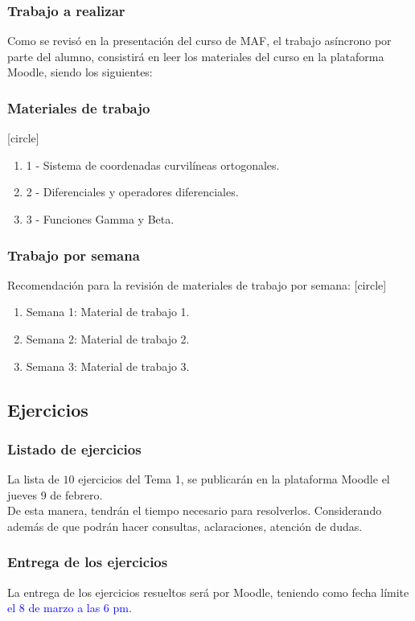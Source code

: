 \documentclass[12pt]{beamer}
\begin{document}
\begin{frame}
\frametitle{Trabajo a realizar}
Como se revisó en la presentación del curso de MAF, el trabajo asíncrono por parte del alumno, consistirá en leer los materiales del curso en la plataforma Moodle, siendo los siguientes:
\end{frame}
\begin{frame}
\frametitle{Materiales de trabajo}
[circle]
\begin{enumerate}[<+->]
\item 1 - Sistema de coordenadas curvilíneas ortogonales.
\item 2 - Diferenciales y operadores diferenciales.
\item 3 - Funciones Gamma y Beta.
\end{enumerate}
\end{frame}
\begin{frame}
\frametitle{Trabajo por semana}
Recomendación para la revisión de materiales de trabajo por semana:
[circle]
\begin{enumerate}[<+->]
\item Semana 1: Material de trabajo 1.
\item Semana 2: Material de trabajo 2.
\item Semana 3: Material de trabajo 3.
\end{enumerate}
\end{frame}

\subsection{Ejercicios}

\begin{frame}
\frametitle{Listado de ejercicios}
La lista de $10$ ejercicios del Tema 1, se publicarán en la plataforma Moodle el jueves 9 de febrero.
\\
\bigskip
\pause
De esta manera, tendrán el tiempo necesario para resolverlos. \pause Considerando además de que podrán hacer consultas, aclaraciones, atención de dudas.
\end{frame}
\begin{frame}
\frametitle{Entrega de los ejercicios}
La entrega de los ejercicios resueltos será por Moodle, teniendo como fecha límite \textcolor{blue}{el $8$ de marzo a las 6 pm.}
\end{frame}
\end{document}
